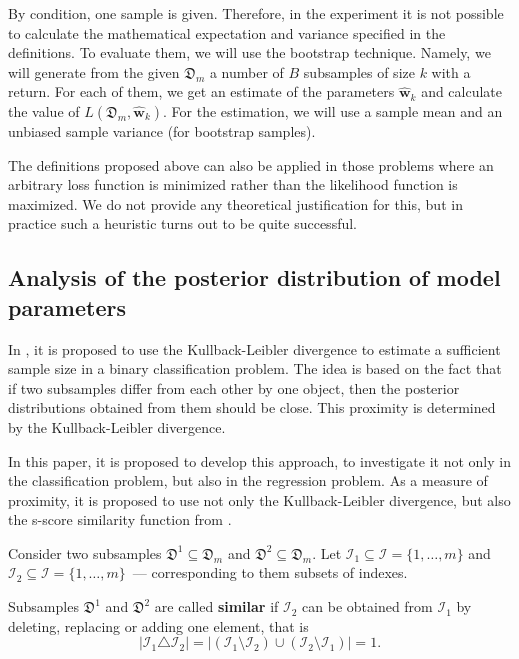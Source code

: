 \documentclass[
11pt,%
tightenlines,%
twoside,%
onecolumn,%
nofloats,%
nobibnotes,%
nofootinbib,%
superscriptaddress,%
noshowpacs,%
centertags]%
{revtex4-2}
\begin{document}
By condition, one sample is given. Therefore, in the experiment it is not possible to calculate the mathematical expectation and variance specified in the definitions. To evaluate them, we will use the bootstrap technique. Namely, we will generate from the given $\mathfrak{D}_m$ a number of $B$ subsamples of size $k$ with a return. For each of them, we get an estimate of the parameters $\hat{\mathbf{w}}_{k}$ and calculate the value of $L(\mathfrak{D}_m, \hat{\mathbf{w}}_{k})$. For the estimation, we will use a sample mean and an unbiased sample variance (for bootstrap samples).

The definitions proposed above can also be applied in those problems where an arbitrary loss function is minimized rather than the likelihood function is maximized. We do not provide any theoretical justification for this, but in practice such a heuristic turns out to be quite successful.

\subsection{Analysis of the posterior distribution of model parameters}

In \citep{MOTRENKO2014743}, it is proposed to use the Kullback-Leibler divergence to estimate a sufficient sample size in a binary classification problem. The idea is based on the fact that if two subsamples differ from each other by one object, then the posterior distributions obtained from them should be close. This proximity is determined by the Kullback-Leibler divergence. 

In this paper, it is proposed to develop this approach, to investigate it not only in the classification problem, but also in the regression problem. As a measure of proximity, it is proposed to use not only the Kullback-Leibler divergence, but also the s-score similarity function from \citep{Aduenko2017}.

Consider two subsamples $\mathfrak{D}^1\subseteq\mathfrak{D}_m$ and $\mathfrak{D}^2\subseteq\mathfrak{D}_m$. Let $\mathcal{I}_1 \subseteq \mathcal{I} = \{1, \ldots, m\}$ and $\mathcal{I}_2 \subseteq \mathcal{I} =\{1, \ldots,m\}$~--- corresponding to them subsets of indexes.

\begin{definition}
    Subsamples $\mathfrak{D}^1$ and $\mathfrak{D}^2$ are called \textbf{similar} if $\mathcal{I}_2$ can be obtained from $\mathcal{I}_1$ by deleting, replacing or adding one element, that is
    \[ \left| \mathcal{I}_1 \triangle \mathcal{I}_2 \right| = \left| \left( \mathcal{I}_1 \setminus \mathcal{I}_2 \right) \cup \left( \mathcal{I}_2 \setminus \mathcal{I}_1 \right) \right| = 1. \]
\end{definition}
\end{document}
